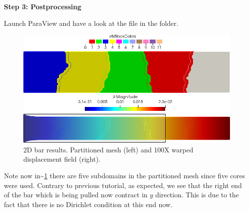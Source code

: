 \textbf{Step 3: Postprocessing}

Launch ParaView and have a look at the  file in the
 folder.

\begin{figure}[htbp]
    \centering
    \begin{minipage}[t][2cm][t]{0.36\textwidth}
    \includegraphics[align=b,width=1\textwidth]{./Images/2d-bar-partitioned5.png}
    \end{minipage}\hspace{.1\textwidth}
    \begin{minipage}[t][2cm][t]{0.5\textwidth}
    \includegraphics[align=b,width=1\textwidth]{./Images/2d-bar-clamped-traction.png}
    \end{minipage}
    \caption{2D bar results. Partitioned mesh (left) and 100X warped displacement field (right).}
    \label{fig:5part}
\end{figure}

Note now in\textasciitilde{}\ref{fig:5part} there are five subdomains in
the partitioned mesh since five cores were used. Contrary to previous
tutorial, as expected, we see that the right end of the bar which is
being pulled now contract in \(y\) direction. This is due to the fact
that there is no Dirichlet condition at this end now.
